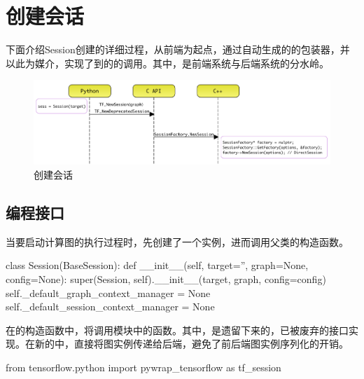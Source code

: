 \section{创建会话}

\begin{content}

下面介绍Session创建的详细过程，从前端为起点，通过自动生成的的包装器，并以此为媒介，实现了到的的调用。其中，是前端系统与后端系统的分水岭。

\begin{figure}[H]
\centering
\includegraphics[width=1.0\textwidth]{figures/py-create-session.png}
\caption{创建会话}
 \label{fig:py-create-session}
\end{figure}

\subsection{编程接口}

当要启动计算图的执行过程时，先创建了一个实例，进而调用父类的构造函数。

\begin{leftbar}
\begin{python}[caption={tensorflow/python/client/session.py}]
class Session(BaseSession):
  def __init__(self, target='', graph=None, config=None):
    super(Session, self).__init__(target, graph, config=config)
    self._default_graph_context_manager = None
    self._default_session_context_manager = None
\end{python}
\end{leftbar}

在的构造函数中，将调用模块中的函数。其中，是遗留下来的，已被废弃的接口实现。在新的中，直接将图实例传递给后端，避免了前后端图实例序列化的开销。

\begin{leftbar}
\begin{python}[caption={tensorflow/python/client/session.py}]
from tensorflow.python import pywrap_tensorflow as tf_session


\end{python}
\end{leftbar}
\end{content}
